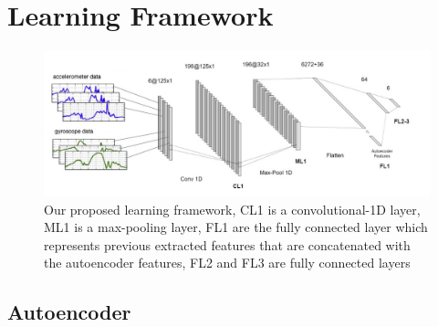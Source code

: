 \section{Learning Framework}
\label{sec:learning-framework}

\begin{figure}[h]
	\centering
	\includegraphics[width=1\textwidth]{images/full_architecture.jpg}
	\caption{Our proposed learning framework, CL1 is a convolutional-1D layer, ML1 is a max-pooling layer, FL1 are the fully connected layer which represents previous extracted features that are concatenated with the autoencoder features, FL2 and FL3 are fully connected layers}
	\label{fig:proposed-architecture}
\end{figure}

\subsection{Autoencoder}
\label{subsec:autoencoder}

